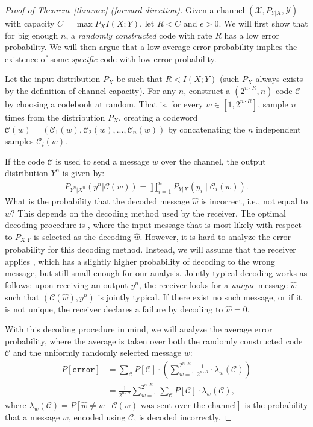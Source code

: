 \begin{proof}[Proof of Theorem~\ref{thm:ncc} (forward direction)]
\newcommand{\cran}{\ensuremath{\mathcal{C}}\xspace}
\newcommand{\xran}{\ensuremath{\mathcal{C}}\xspace}
\newcommand{\cspec}{\ensuremath{\mathcal{C}^*}\xspace}
\newcommand{\error}{\texttt{error}}
Given a channel $(\mathcal{X},P_{Y|X},\mathcal{Y})$ with capacity $C = \max{P_X} I(X;Y)$, let $R < C$ and $\epsilon > 0$. We will first show that for big enough $n$, a \emph{randomly constructed} code with rate $R$ has a low error probability. We will then argue that a low average error probability implies the existence of some \emph{specific} code with low error probability.

Let the input distribution $P_X$ be such that $R < I(X;Y)$ (such $P_X$ always exists by the definition of channel capacity). For any $n$, construct a $(2^{n \cdot R},n)$-code \cran by choosing a codebook at random. That is, for every $w \in [1,2^{n \cdot R}]$, sample $n$ times from the distribution $P_X$, creating a codeword $\cran(w) = (\xran_1(w), \xran_2(w), ..., \xran_n(w))$ by concatenating the $n$ independent samples $\xran_i(w)$.

If the code \cran is used to send a message $w$ over the channel, the output distribution $Y^n$ is given by:
\begin{align}
P_{Y^n|X^n}(y^n|\cran(w)) = \prod_{i=1}^n P_{Y|X} (y_i \mid \xran_i(w)).
\end{align}
What is the probability that the decoded message $\hat{w}$ is incorrect, i.e., not equal to $w$? This depends on the decoding method used by the receiver. The optimal decoding procedure is , where the input message that is most likely with respect to $P_{X|Y}$ is selected as the decoding $\hat{w}$. However, it is hard to analyze the error probability for this decoding method. Instead, we will assume that the receiver applies , which has a slightly higher probability of decoding to the wrong message, but still small enough for our analysis. Jointly typical decoding works as follows: upon receiving an output $y^n$, the receiver looks for a \emph{unique} message $\hat{w}$ such that $(\cran(\hat{w}),y^n)$ is jointly typical. If there exist no such message, or if it is not unique, the receiver declares a failure by decoding to $\hat{w} = 0$.

With this decoding procedure in mind, we will analyze the average error probability, where the average is taken over both the randomly constructed code \cran and the uniformly randomly selected message $w$:
\begin{align}
P[\error] &= \sum_{\cran} P[\cran] \cdot \left(\sum_{w=1}^{2^{n\cdot R}} \frac{1}{2^{n \cdot R}} \cdot \lambda_w(\cran) \right)\nonumber\\
&= \frac{1}{2^{n \cdot R}} \sum_{w = 1}^{2^{n \cdot R}} \sum_{\cran} P[\cran] \cdot \lambda_w(\cran),\label{eq:prob-error}
\end{align}
where $\lambda_w(\cran) = P[\hat{w} \neq w \mid \cran(w) \text{ was sent over the channel}]$ is the probability that a message $w$, encoded using $\cran$, is decoded incorrectly.


\end{proof}

